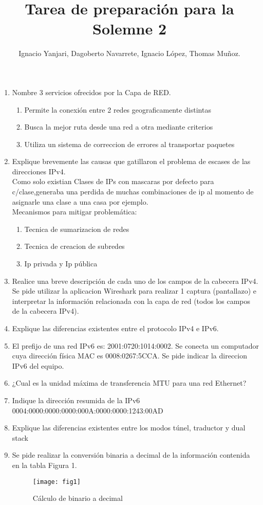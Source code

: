 \documentclass{udparticle}
\title{Tarea de preparación para la Solemne 2}
\author{Ignacio Yanjari, Dagoberto Navarrete, Ignacio López, Thomas Muñoz.}
\begin{document}
\maketitle
\begin{enumerate}
\item Nombre 3 servicios ofrecidos por la Capa de RED.
\begin{enumerate}
\item Permite la conexión entre 2 redes geograficamente distintas
\item Busca la mejor ruta desde una red a otra mediante criterios
\item Utiliza un sistema de correccion de errores al transportar paquetes
\end{enumerate}
\item Explique brevemente las causas que gatillaron el problema de escases de las direcciones IPv4.\\
Como solo existian Clases de IPs con mascaras por defecto para c/clase,generaba una 
perdida de muchas combinaciones de ip al momento de asignarle una clase a una casa por 
ejemplo.\\
Mecanismos para mitigar problemática:
\begin{enumerate}
\item Tecnica de sumarizacion de redes 
\item Tecnica de  creacion de subredes
\item Ip privada y Ip pública
\end{enumerate}
\item Realice una breve descripción de cada uno de los campos de la cabecera IPv4. Se pide utilizar la aplicacion Wireshark para realizar 1 captura (pantallazo) e interpretar la información relacionada con la capa de red (todos los campos de la cabecera IPv4).
\item Explique las diferencias existentes entre el protocolo IPv4 e IPv6.
\item El prefijo de una red IPv6 es: 2001:0720:1014:0002. Se conecta un
computador cuya dirección física MAC es 0008:0267:5CCA. Se pide indicar la direccion IPv6 del equipo.
\item ¿Cual es la unidad máxima de transferencia MTU para una red Ethernet?
\item Indique la dirección resumida de la IPv6 0004:0000:0000:0000:000A:0000:0000:1243:00AD
\item Explique las diferencias existentes entre los modos túnel, traductor y dual stack
\item Se pide realizar la conversión binaria a decimal de la información contenida en la tabla Figura 1.
	\begin{figure}[H]
	\centering
	\texttt{[image: fig1]}
	\caption{Cálculo de binario a decimal}
	\end{figure}
\clearpage


\end{enumerate}
\end{document}
